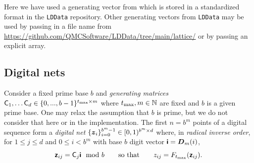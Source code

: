 \documentclass[acmsmall]{acmart}
\begin{document}
\begin{listing}[H]
    \inputminted{python}{snippets/lattice.txt}
    \caption{Generate randomized lattices.}
    \label{code:lattice}
\end{listing}

\noindent Here we have used a generating vector from \citep{cools2006constructing} which is stored in a standardized format in the \texttt{LDData} repository. Other generating vectors from \texttt{LDData} may be used by passing in a file name from \url{https://github.com/QMCSoftware/LDData/tree/main/lattice/} or by passing an explicit array. 

\subsection{Digital nets} 

Consider a fixed prime base $b$ and \emph{generating matrices} ${\mathsf{C}}_1,\dots{\mathsf{C}}_d \in \{0,...,b-1\}^{t_\mathrm{max} \times m}$ where $t_\mathrm{max},m \in {\mathbb{N}}$ are fixed and $b$ is a given prime base. One may relax the assumption that $b$ is prime, but we do not consider that here or in the implementation. The first $n=b^m$ points of a digital sequence form a \emph{digital net} $\{{\boldsymbol{z}}_i\}_{i=0}^{b^m-1} \in [0,1)^{b^m \times d}$ where, in \emph{radical inverse order}, for $1 \leq j \leq d$ and $0 \leq i < b^m$ with base $b$ digit vector ${\boldsymbol{\mathsf{i}}} = {\boldsymbol{D}}_m(i)$, 
$${\boldsymbol{\mathsf{z}}}_{ij} = {\mathsf{C}}_j {\boldsymbol{\mathsf{i}}} \mod b \qquad\text{so that}\qquad z_{ij} = F_{t_\mathrm{max}}({\boldsymbol{\mathsf{z}}}_{ij}).$$
\end{document}
